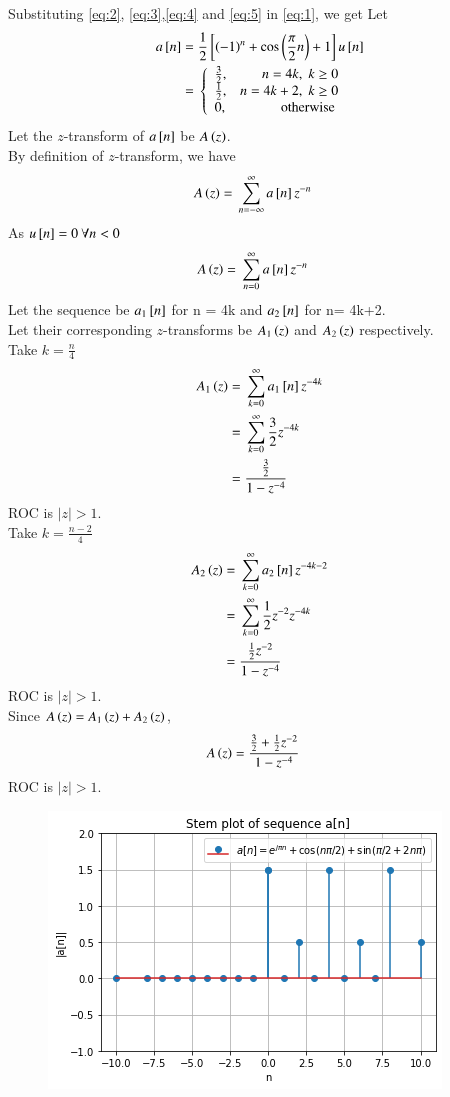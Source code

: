 \documentclass[journal,12pt,twocolumn]{IEEEtran}
\begin{document}
Substituting \eqref{eq:2}, \eqref{eq:3},\eqref{eq:4} and \eqref{eq:5} in \eqref{eq:1}, we get 
Let 
\begin{align}
\label{eq:6}
a{}\left[n\right] ={}& \frac{1}{2}{}\left[\left(-1\right)^{n} + \cos\left(\frac{\pi}{2} n\right) + 1\right]u{}\left[n\right]\\
\label{eq:7}
={}& \left\{
  \begin{array}{lr} 
      \frac{3}{2}, & n = 4k,\; k\geq 0 \\
      \frac{1}{2}, & n = 4k+2,\; k \geq 0 \\
      0, & \text{ otherwise }
      \end{array}
\right.
\end{align}
Let the $z$-transform of $a{}\left[n\right]$ be $A\left(z\right)$.\\
By definition of $z$-transform, we have
\begin{align}
\label{eq:8}
A\left(z\right)={}& \sum_{n=-\infty}^\infty a{}\left[n\right]z^{-n}
\end{align}
As $u{}\left[n\right] = 0\: \forall n< 0$
\begin{align}
\label{eq:9}
A\left(z\right)={}& \sum_{n=0}^\infty a{}\left[n\right]z^{-n}
\end{align}
Let the sequence be $a_{1}{}\left[n\right]$ for n = 4k and $a_{2}{}\left[n\right]$ for n= 4k+2. \\
Let their corresponding $z$-transforms be $A_{1}\left(z\right)$ and $A_{2}\left(z\right)$ respectively.\\
Take $k=\frac{n}{4}$
\begin{align}
\label{eq:10}
A_{1}\left(z\right) = {}& \sum_{k=0}^\infty a_{1}{}\left[n\right]z^{-4k}\\
\label{eq:11}
={}& \sum_{k=0}^\infty \frac{3}{2}z^{-4k}\\
\label{eq:12}
={}& \frac{\frac{3}{2}}{1-z^{-4}}
\end{align}
ROC is $|z|>1$.\\
Take $k=\frac{n-2}{4}$
\begin{align}
\label{eq:13}
A_{2}\left(z\right) = {}& \sum_{k=0}^\infty a_{2}{}\left[n\right]z^{-4k-2}\\
\label{eq:14}
={}& \sum_{k=0}^\infty \frac{1}{2}z^{-2}z^{-4k}\\
\label{eq:15}
={}& \frac{\frac{1}{2}z^{-2}}{1-z^{-4}}
\end{align}
ROC is $|z|>1$.\\
Since $A\left(z\right)= A_{1}\left(z\right) + A_{2}\left(z\right)$,
\begin{align}
A\left(z\right) ={}& \frac{\frac{3}{2}+\frac{1}{2}z^{-2}}{1-z^{-4}}
\end{align}
ROC is $|z|>1$.
\begin{figure}[h]
\centering
\includegraphics[width = \columnwidth]{q2_quiz2}
\end{figure}
\end{document}
